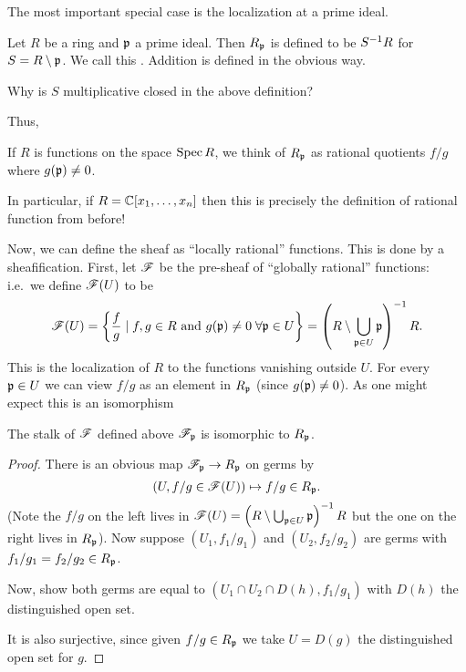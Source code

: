 The most important special case is the localization at a prime ideal.
\begin{definition}
	Let $R$ be a ring and $\mathfrak p$ a prime ideal.
	Then $R_\mathfrak p$ is defined to be $S^{-1} R$ for $S = R\setminus\mathfrak p$.
	We call this .
	Addition is defined in the obvious way.
\end{definition}
\begin{ques}
	Why is $S$ multiplicative closed in the above definition?
\end{ques}
Thus,
\begin{moral}
	If $R$ is functions on the space $\operatorname{Spec} R$,
	we think of $R_\mathfrak p$ as rational quotients $f/g$ where $g(\mathfrak p) \neq 0$.
\end{moral}
In particular, if $R = \mathbb C[x_1, \dots, x_n]$
then this is precisely the definition of rational function from before!

Now, we can define the sheaf as ``locally rational'' functions.
This is done by a sheafification.
First, let $\mathscr F$ be the pre-sheaf of ``globally rational'' functions:
i.e.\ we define $\mathscr F(U)$ to be
\[
	\mathscr F(U) = \left\{ 
		\frac fg \mid f, g \in R
		\text{ and } g(\mathfrak p) \neq 0 \; \forall \mathfrak p \in U
	\right\}
	= \left(R \setminus \bigcup_{\mathfrak p \in U} \mathfrak p \right)^{-1} R.
\]
This is the localization of $R$ to the functions vanishing outside $U$.
For every $\mathfrak p \in U$ we can view $f/g$ as an element in $R_\mathfrak p$
(since $g(\mathfrak p) \ne 0$).
As one might expect this is an isomorphism
\begin{lemma}
	\label{lem:global_rational_stalk}
	The stalk of $\mathscr F$ defined above $\mathscr F_\mathfrak p$ is isomorphic to $R_\mathfrak p$.
\end{lemma}
\begin{proof}
	There is an obvious map $\mathscr F_\mathfrak p \to R_\mathfrak p$ on germs by
	\[
		\left(U, f/g \in \mathscr F(U) \right)
		\mapsto f/g \in R_\mathfrak p . \]
	(Note the $f/g$ on the left lives in
	$\mathscr F(U) = \left(R \setminus \bigcup_{\mathfrak p \in U} \mathfrak p \right)^{-1} R$
	but the one on the right lives in $R_\mathfrak p$).
	Now suppose $(U_1, f_1 / g_1)$ and $(U_2, f_2 / g_2)$
	are germs with $f_1/g_1 = f_2/g_2 \in R_\mathfrak p$.
	\begin{exercise}
		Now, show both germs are equal to $(U_1 \cap U_2 \cap D(h), f_1 / g_1)$
		with $D(h)$ the distinguished open set.
	\end{exercise}
	It is also surjective, since given $f/g \in R_\mathfrak p$ we take $U = D(g)$
	the distinguished open set for $g$.
\end{proof}

